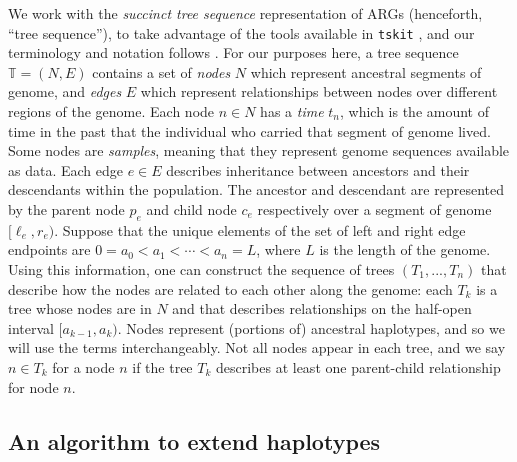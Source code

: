 \documentclass[10pt,twoside,lineno]{gsajnl}
\newcommand{\T}{\mathbb{T}}
\newcommand{\tskit}{\texttt{tskit}}
\begin{document}
We work with the \emph{succinct tree sequence} representation of ARGs (henceforth, ``tree sequence''),
to take advantage of the %
tools available in \tskit{} \citep{tskit}, 
and our terminology and notation follows \citet{ralph2020efficiently}.
For our purposes here,
a tree sequence $\T = (N, E)$ contains a set of \emph{nodes} $N$ 
which represent ancestral segments of genome,
and \emph{edges} $E$ which represent relationships between nodes over different regions of the genome.
Each node $n \in N$ has a \emph{time} $t_n$,
which is the amount of time in the past that the individual who carried that segment of genome lived. 
Some nodes are \emph{samples}, meaning that they represent genome sequences available as data.
Each edge $e \in E$ describes inheritance between ancestors and their descendants within the population.
The ancestor and descendant are represented by the parent node $p_e$ and child node $c_e$ respectively 
over a segment of genome $[\ell_e, r_e)$.
Suppose that the unique elements of the set of left and right edge endpoints
are $0 = a_0 < a_1 < \cdots < a_{n} = L$, where $L$ is the length of the genome.
Using this information, one can construct the sequence of 
trees $\left(T_1,...,T_{n}\right)$ that describe how the nodes are related to each other along the genome:
each $T_k$ is a tree whose nodes are in $N$
and that describes relationships on the half-open interval $[a_{k-1}, a_k)$.
Nodes represent (portions of) ancestral haplotypes, and so
we will use the terms interchangeably.
Not all nodes appear in each tree,
and we say $n \in T_k$ for a node $n$ if the tree $T_k$ describes at least one parent-child relationship
for node $n$.

\subsection{An algorithm to extend haplotypes}
\end{document}
